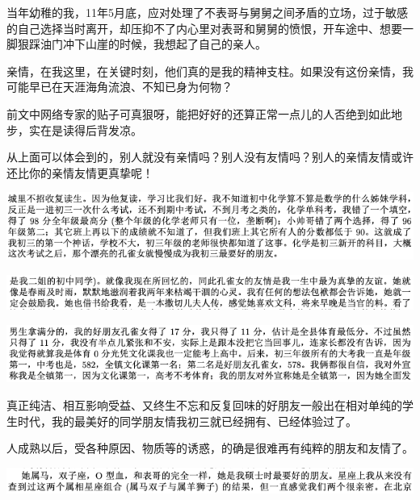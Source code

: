 \documentclass[9pt, b5paper]{article}
\begin{document}
当年幼稚的我，11年5月底，应对处理了不表哥与舅舅之间矛盾的立场，过于敏感的自己选择当时离开，却压抑不了内心里对表哥和舅舅的愤恨，开车途中、想要一脚狠踩油门冲下山崖的时候，我想起了自己的亲人。

亲情，在我这里，在关键时刻，他们真的是我的精神支柱。如果没有这份亲情，我可能早已在天涯海角流浪、不知已身为何物？

前文中网络专家的贴子可真狠呀，能把好好的还算正常一点儿的人否绝到如此地步，实在是读得后背发凉。

从上面可以体会到的，别人就没有亲情吗？别人没有友情吗？别人的亲情友情或许还比你的亲情友情更真挚呢！

\begin{center}
\includegraphics[width=.9\linewidth]{./pic/backups_plans_20210413_170005.png}
\end{center}

\begin{center}
\includegraphics[width=.9\linewidth]{./pic/backups_plans_20210413_170222.png}
\end{center}

\begin{center}
\includegraphics[width=.9\linewidth]{./pic/backups_plans_20210413_170521.png}
\end{center}

真正纯洁、相互影响受益、又终生不忘和反复回味的好朋友一般出在相对单纯的学生时代，我的最美好的同学朋友情我初三就已经拥有、已经体验过了。

人成熟以后，受各种原因、物质等的诱惑，的确是很难再有纯粹的朋友和友情了。

\begin{center}
\includegraphics[width=.9\linewidth]{./pic/backups_plans_20210413_170728.png}
\end{center}
\end{document}
